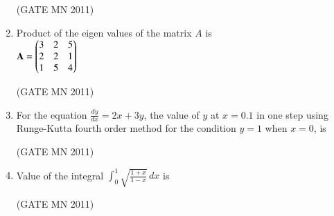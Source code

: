 \documentclass[journal]{IEEEtran}
\begin{document}
\begin{enumerate}
\hfill(GATE MN 2011)
\begin{enumerate}
\end{enumerate}

\item 
Product of the eigen values of the matrix $A$ is\\ 

$\mathbf{A} = \begin{pmatrix}
3 & 2 & 5 \\
2 & 2 & 1 \\
1 & 5 & 4
\end{pmatrix}$

\hfill(GATE MN 2011)

\begin{enumerate}
\end{enumerate}

\item 
For the equation $\frac{dy}{dx} = 2x + 3y$, the value of $y$ at $x = 0.1$ in one step using Runge-Kutta fourth order method for the condition $y = 1$ when $x = 0$, is 

\hfill(GATE MN 2011)
\begin{enumerate}
\end{enumerate}

\item 
Value of the integral $\int_{0}^{1} \sqrt{\frac{1+x}{1-x}} \, dx$ is 

\hfill(GATE MN 2011)
\begin{enumerate}
\end{enumerate}


\end{enumerate}
\end{document}
